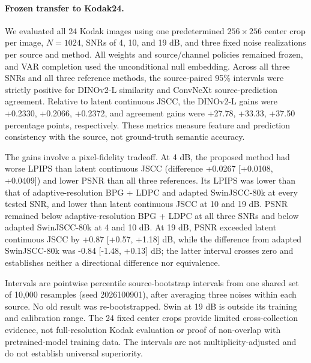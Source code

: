 
\paragraph{Frozen transfer to Kodak24.} We evaluated all 24 Kodak images using one predetermined $256\times256$ center crop per image, $N=1024$, SNRs of 4, 10, and 19 dB, and three fixed noise realizations per source and method. All weights and source/channel policies remained frozen, and VAR completion used the unconditional null embedding. Across all three SNRs and all three reference methods, the source-paired 95\% intervals were strictly positive for DINOv2-L similarity and ConvNeXt source-prediction agreement. Relative to latent continuous JSCC, the DINOv2-L gains were +0.2330, +0.2066, +0.2372, and agreement gains were +27.78, +33.33, +37.50 percentage points, respectively. These metrics measure feature and prediction consistency with the source, not ground-truth semantic accuracy.

The gains involve a pixel-fidelity tradeoff. At 4 dB, the proposed method had worse LPIPS than latent continuous JSCC (difference +0.0267 [+0.0108, +0.0409]) and lower PSNR than all three references. Its LPIPS was lower than that of adaptive-resolution BPG + LDPC and adapted SwinJSCC-80k at every tested SNR, and lower than latent continuous JSCC at 10 and 19 dB. PSNR remained below adaptive-resolution BPG + LDPC at all three SNRs and below adapted SwinJSCC-80k at 4 and 10 dB. At 19 dB, PSNR exceeded latent continuous JSCC by +0.87 [+0.57, +1.18] dB, while the difference from adapted SwinJSCC-80k was -0.84 [-1.48, +0.13] dB; the latter interval crosses zero and establishes neither a directional difference nor equivalence.

Intervals are pointwise percentile source-bootstrap intervals from one shared set of 10,000 resamples (seed 2026100901), after averaging three noises within each source. No old result was re-bootstrapped. Swin at 19 dB is outside its training and calibration range. The 24 fixed center crops provide limited cross-collection evidence, not full-resolution Kodak evaluation or proof of non-overlap with pretrained-model training data. The intervals are not multiplicity-adjusted and do not establish universal superiority.

